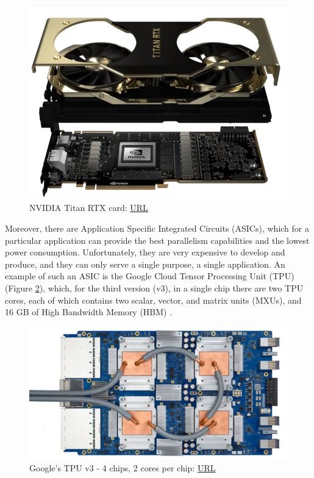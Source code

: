 \begin{figure} [H]
	\centering
	\includegraphics[scale=0.5]{Images/Hardware/NVIDIA-Titan-RTX.png}
	\decoRule
	\caption[NVIDIA Titan RTX card]{NVIDIA Titan RTX card: \href{https://www.nvidia.com/en-us/deep-learning-ai/products/titan-rtx/}{URL}}
	\label{fig:nvidia-titan-rtx-explosion-view}
\end{figure}

Moreover, there are Application Specific Integrated Circuits (ASICs), which for a particular application can provide the best parallelism capabilities and the lowest power consumption. Unfortunately, they are very expensive to develop and produce, and they can only serve a single purpose, a single application. An example of such an ASIC is the Google Cloud Tensor Processing Unit (TPU) (Figure \ref{fig:google-tpu-motherboard}), which, for the third version (v3), in a single chip there are two TPU cores, each of which contains two scalar, vector, and matrix units (MXUs), and 16 GB of High Bandwidth Memory (HBM) \cite{Google-Cloud-TPU}.

\begin{figure} [H]
	\centering
	\includegraphics[width=\textwidth]{Images/Hardware/tpu-v3.png}
	\decoRule
	\caption[Google's TPU v3]{Google's TPU v3 - 4 chips, 2 cores per chip: \href{https://cloud.google.com/tpu/docs/system-architecture}{URL}}
	\label{fig:google-tpu-motherboard}
\end{figure}

